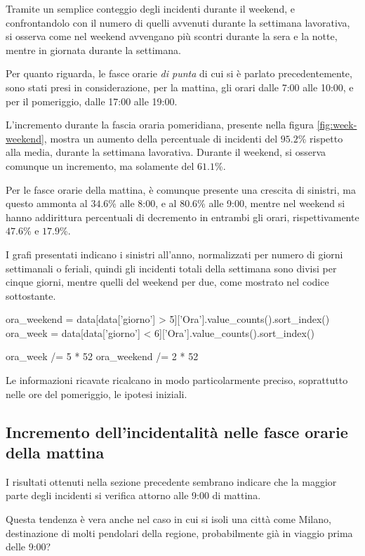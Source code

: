 \documentclass[a4paper,12pt]{report}
\newcommand{\quotestyle}[1]{\textit{#1}}
\begin{document}
Tramite un semplice conteggio degli incidenti durante il weekend, e 
confrontandolo con il numero di quelli avvenuti durante la 
settimana lavorativa, si osserva come nel weekend avvengano più scontri 
durante la sera e la notte, mentre in giornata durante la settimana.

Per quanto riguarda, le fasce orarie \quotestyle{di punta} di cui si 
è parlato precedentemente, 
sono stati presi in considerazione, per la mattina, gli orari dalle 7:00 alle 10:00, 
e per il pomeriggio, dalle 17:00 alle 19:00.

L'incremento durante la fascia oraria pomeridiana, presente nella figura 
\ref{fig:week-weekend}, mostra un aumento della percentuale di incidenti 
del $95.2$\% rispetto alla media, durante la settimana lavorativa. 
Durante il weekend, si osserva comunque un incremento, ma solamente del $61.1$\%.

Per le fasce orarie della mattina, è comunque presente una crescita di sinistri, 
ma questo ammonta al $34.6$\% alle 8:00, e al $80.6$\% alle 9:00, 
mentre nel weekend si hanno addirittura percentuali di decremento 
in entrambi gli orari, rispettivamente $47.6$\% e $17.9$\%.

I grafi presentati indicano i sinistri all'anno, normalizzati per numero di 
giorni settimanali o feriali, quindi gli incidenti totali della settimana sono divisi 
per cinque giorni, mentre quelli del weekend per due, 
come mostrato nel codice sottostante.

\begin{code}[language=Python]
ora_weekend = data[data['giorno'] > 5]['Ora'].value_counts().sort_index()
ora_week = data[data['giorno'] < 6]['Ora'].value_counts().sort_index()

ora_week /= 5 * 52
ora_weekend /= 2 * 52
\end{code}

Le informazioni ricavate ricalcano in modo particolarmente preciso, 
soprattutto nelle ore del pomeriggio, le ipotesi iniziali.

\subsection{Incremento dell'incidentalità nelle fasce orarie della mattina}

I risultati ottenuti nella sezione precedente sembrano indicare 
che la maggior parte degli incidenti si verifica attorno alle 9:00 di mattina. 

Questa tendenza è vera anche nel caso in cui si isoli una città come Milano, 
destinazione di molti pendolari della regione, probabilmente 
già in viaggio prima delle 9:00?
\end{document}
